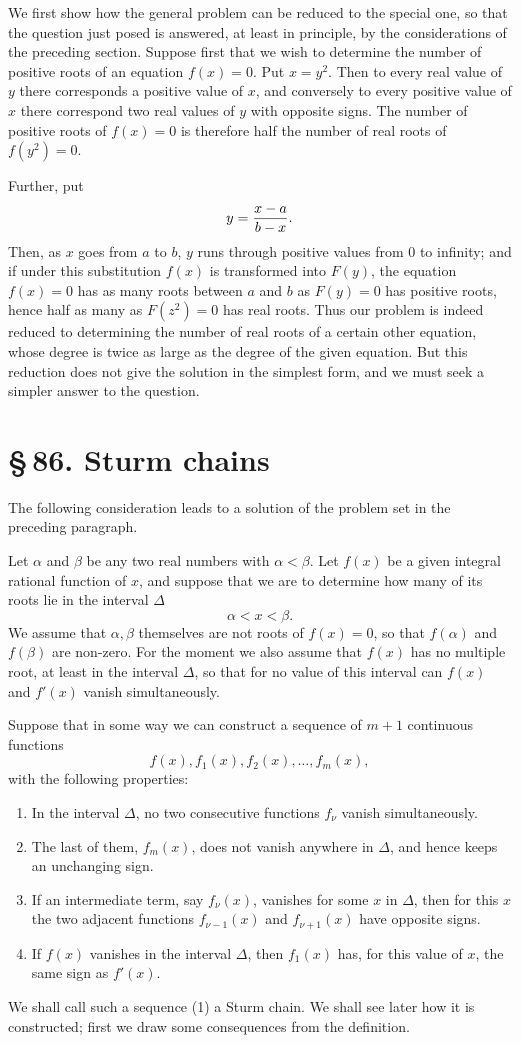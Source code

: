 \documentclass[11pt]{article}
\providecommand{\sect}[2]{\section*{\S\,#1. #2}}
\begin{document}
We first show how the general problem can be reduced to the special one, so that the question just posed is answered, at least in principle, by the considerations of the preceding section. Suppose first that we wish to determine the number of positive roots of an equation $f(x)=0$. Put $x=y^2$. Then to every real value of $y$ there corresponds a positive value of $x$, and conversely to every positive value of $x$ there correspond two real values of $y$ with opposite signs. The number of positive roots of $f(x)=0$ is therefore half the number of real roots of $f(y^2)=0$.

Further, put
\[
        y={x-a\over b-x}.
\]
Then, as $x$ goes from $a$ to $b$, $y$ runs through positive values from $0$ to infinity; and if under this substitution $f(x)$ is transformed into $F(y)$, the equation $f(x)=0$ has as many roots between $a$ and $b$ as $F(y)=0$ has positive roots, hence half as many as $F(z^2)=0$ has real roots. Thus our problem is indeed reduced to determining the number of real roots of a certain other equation, whose degree is twice as large as the degree of the given equation. But this reduction does not give the solution in the simplest form, and we must seek a simpler answer to the question.

\sect{86}{Sturm chains}

The following consideration leads to a solution of the problem set in the preceding paragraph.

Let $\alpha$ and $\beta$ be any two real numbers with $\alpha<\beta$. Let $f(x)$ be a given integral rational function of $x$, and suppose that we are to determine how many of its roots lie in the interval $\Delta$
\[
        \alpha<x<\beta.
\]
We assume that $\alpha,\beta$ themselves are not roots of $f(x)=0$, so that $f(\alpha)$ and $f(\beta)$ are non-zero. For the moment we also assume that $f(x)$ has no multiple root, at least in the interval $\Delta$, so that for no value of this interval can $f(x)$ and $f'(x)$ vanish simultaneously.

Suppose that in some way we can construct a sequence of $m+1$ continuous functions
\begin{equation}
        f(x), f_1(x), f_2(x),\ldots, f_m(x),
\tag{1}
\end{equation}
with the following properties:
\begin{enumerate}[label=\arabic*.,leftmargin=2.8em]
\item In the interval $\Delta$, no two consecutive functions $f_\nu$ vanish simultaneously.
\item The last of them, $f_m(x)$, does not vanish anywhere in $\Delta$, and hence keeps an unchanging sign.
\item If an intermediate term, say $f_\nu(x)$, vanishes for some $x$ in $\Delta$, then for this $x$ the two adjacent functions $f_{\nu-1}(x)$ and $f_{\nu+1}(x)$ have opposite signs.
\item If $f(x)$ vanishes in the interval $\Delta$, then $f_1(x)$ has, for this value of $x$, the same sign as $f'(x)$.
\end{enumerate}
We shall call such a sequence (1) a Sturm chain. We shall see later how it is constructed; first we draw some consequences from the definition.
\end{document}
